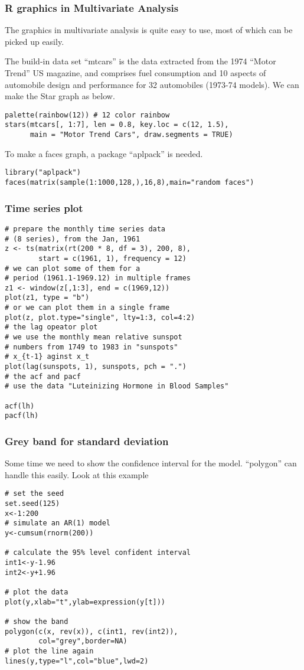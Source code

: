\documentclass[10pt]{beamer}
\begin{document}
\begin{frame}[fragile]
  \frametitle{R graphics in Multivariate Analysis}
  The graphics in multivariate analysis is quite easy to use, most of
  which can be picked up easily.

  The build-in data set ``mtcars'' is the data extracted from the 1974
  ``Motor Trend'' US magazine, and comprises fuel consumption and 10
  aspects of automobile design and performance for 32 automobiles
  (1973-74 models). We can make the Star graph as below.
\begin{verbatim}
palette(rainbow(12)) # 12 color rainbow
stars(mtcars[, 1:7], len = 0.8, key.loc = c(12, 1.5),
      main = "Motor Trend Cars", draw.segments = TRUE)
\end{verbatim}


  To make a faces graph, a package ``aplpack'' is needed.
\begin{verbatim}
library("aplpack")
faces(matrix(sample(1:1000,128,),16,8),main="random faces")
\end{verbatim}
\end{frame}

\begin{frame}[fragile]
  \frametitle{Time series plot}
\begin{verbatim}
# prepare the monthly time series data
# (8 series), from the Jan, 1961
z <- ts(matrix(rt(200 * 8, df = 3), 200, 8),
        start = c(1961, 1), frequency = 12)
# we can plot some of them for a
# period (1961.1-1969.12) in multiple frames
z1 <- window(z[,1:3], end = c(1969,12))
plot(z1, type = "b")
# or we can plot them in a single frame
plot(z, plot.type="single", lty=1:3, col=4:2)
# the lag opeator plot
# we use the monthly mean relative sunspot
# numbers from 1749 to 1983 in "sunspots"
# x_{t-1} aginst x_t
plot(lag(sunspots, 1), sunspots, pch = ".")
# the acf and pacf
# use the data "Luteinizing Hormone in Blood Samples"

acf(lh)
pacf(lh)
\end{verbatim}
\end{frame}


\begin{frame}[fragile]
  \frametitle{Grey band for standard deviation}

  Some time we need to show the confidence interval for the
  model. ``polygon'' can handle this easily. Look at this example
\begin{verbatim}
# set the seed
set.seed(125)
x<-1:200
# simulate an AR(1) model
y<-cumsum(rnorm(200))

# calculate the 95% level confident interval
int1<-y-1.96
int2<-y+1.96

# plot the data
plot(y,xlab="t",ylab=expression(y[t]))

# show the band
polygon(c(x, rev(x)), c(int1, rev(int2)),
        col="grey",border=NA)
# plot the line again
lines(y,type="l",col="blue",lwd=2)
\end{verbatim}
\end{frame}
\end{document}
